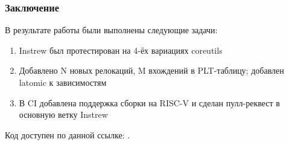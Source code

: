 \documentclass{beamer}
\begin{document}
\begin{frame}
	\frametitle{Заключение}
	В результате работы были выполнены следующие задачи:
	\vspace{8pt}
	\begin{enumerate}
		\item Instrew был протестирован на 4-ёх вариациях coreutils
		\item Добавлено N новых релокаций, M вхождений в PLT-таблицу; добавлен latomic к зависимостям
		\item В CI добавлена поддержка сборки на RISC-V и сделан пулл-реквест в основную ветку Instrew

	\end{enumerate}
	\vspace{8pt}
	Код доступен по данной ссылке: \href{https://github.com/aengelke/instrew/pull/20}{\color{blue}{https://github.com/aengelke/instrew/pull/20}}.

\end{frame}

\appendix


\end{document}

